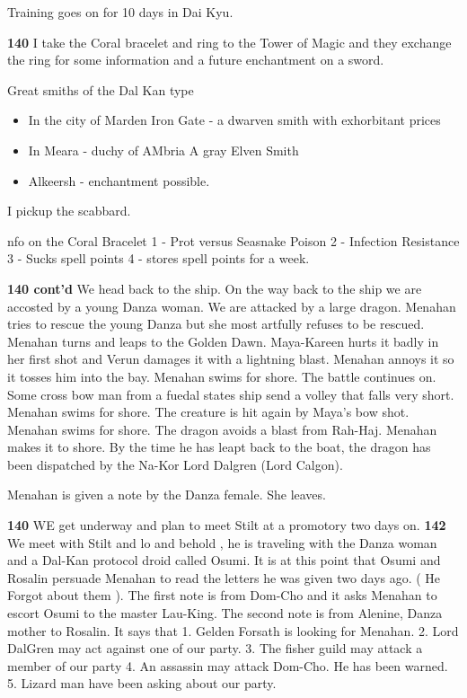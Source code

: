 \documentclass[10pt]{report}
\begin{document}
Training goes on for 10 days in Dai Kyu.

{\bf 140  }I take the Coral bracelet and ring to the Tower of Magic and they
exchange the ring for some information and a future enchantment on a
sword.

Great smiths of the Dal Kan type

\begin{itemize}
         \item In the city of Marden
        Iron Gate - a dwarven smith with exhorbitant prices

         \item  In Meara - duchy of AMbria
        A gray Elven Smith

         \item Alkeersh - enchantment possible.
\end{itemize}

I pickup the scabbard.

nfo on the Coral Bracelet
1 - Prot versus Seasnake Poison
2 - Infection Resistance
3 - Sucks spell points
4 - stores spell points for a week.

{\bf 140 cont'd } We head back to the ship.
On the way back to the ship we are accosted by a young Danza woman.
We are attacked by a large dragon. Menahan tries to rescue the young
Danza but she most artfully refuses to be rescued. Menahan turns and
leaps to the Golden Dawn. Maya-Kareen hurts it badly in
her first shot and Verun damages it with a lightning blast. Menahan
annoys it so it tosses him into the bay. Menahan swims for shore. The
battle continues on. Some cross bow man from a fuedal states ship send a
volley that falls very short. Menahan swims for shore. The creature is
hit again by Maya's bow shot. Menahan swims for shore. The dragon avoids
a blast from Rah-Haj. Menahan makes it to shore. By the time he has
leapt back to the boat, the dragon has been dispatched by the Na-Kor
Lord Dalgren (Lord Calgon).

Menahan is given a note by the Danza female. She leaves.

{\bf 140  }WE get underway and plan to meet Stilt at a promotory two days on.
{\bf 142  }We meet with Stilt and lo and behold , he is traveling with the
Danza woman and a Dal-Kan protocol droid called Osumi. It is at this
point that Osumi and Rosalin persuade Menahan to read the letters he was
given two days ago. ( He Forgot about them ).
        The first note is from Dom-Cho and it asks Menahan to escort
Osumi to the master Lau-King.
        The second note is from Alenine, Danza mother to Rosalin. It says
that
1. Gelden Forsath is looking for Menahan.
2. Lord DalGren may act against one of our party.
3. The fisher guild may attack a member of our party
4. An assassin may attack Dom-Cho. He has been warned.
5. Lizard man have been asking about our party.
\end{document}
